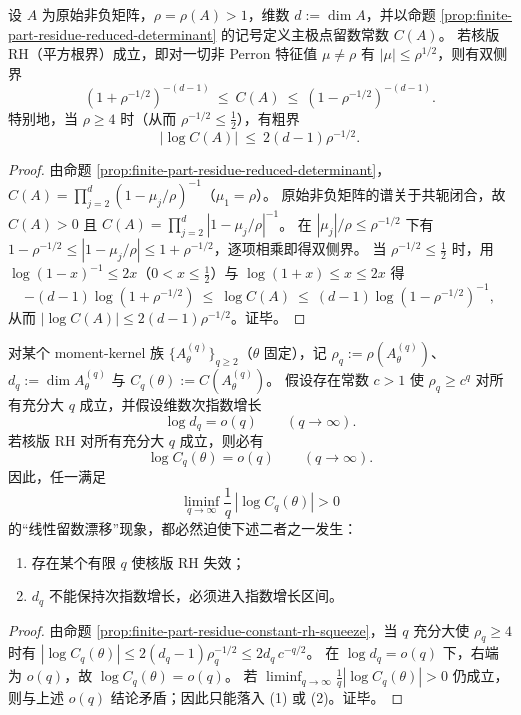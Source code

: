 \begin{proposition}\label{prop:finite-part-residue-constant-rh-squeeze}
设 \(A\) 为原始非负矩阵，\(\rho=\rho(A)>1\)，维数 \(d:=\dim A\)，并以命题 \ref{prop:finite-part-residue-reduced-determinant} 的记号定义主极点留数常数 \(C(A)\)。
若核版 RH（平方根界）成立，即对一切非 Perron 特征值 \(\mu\neq\rho\) 有 \(|\mu|\le \rho^{1/2}\)，则有双侧界
\[
(1+\rho^{-1/2})^{-(d-1)}\ \le\ C(A)\ \le\ (1-\rho^{-1/2})^{-(d-1)}.
\]
特别地，当 \(\rho\ge 4\) 时（从而 \(\rho^{-1/2}\le \tfrac12\)），有粗界
\[
|\log C(A)|\ \le\ 2(d-1)\rho^{-1/2}.
\]
\end{proposition}

\begin{proof}
由命题 \ref{prop:finite-part-residue-reduced-determinant}，
\(
C(A)=\prod_{j=2}^{d}(1-\mu_j/\rho)^{-1}
\)（\(\mu_1=\rho\)）。
原始非负矩阵的谱关于共轭闭合，故 \(C(A)>0\) 且
\(
C(A)=\prod_{j=2}^{d}|1-\mu_j/\rho|^{-1}
\)。
在 \(|\mu_j|/\rho\le \rho^{-1/2}\) 下有
\(
1-\rho^{-1/2}\le |1-\mu_j/\rho|\le 1+\rho^{-1/2}
\)，逐项相乘即得双侧界。
当 \(\rho^{-1/2}\le\tfrac12\) 时，用 \(\log(1-x)^{-1}\le 2x\)（\(0<x\le\tfrac12\)）与 \(\log(1+x)\le x\le 2x\) 得
\[
-(d-1)\log(1+\rho^{-1/2})
\ \le\ \log C(A)\ \le\ (d-1)\log(1-\rho^{-1/2})^{-1},
\]
从而 \(|\log C(A)|\le 2(d-1)\rho^{-1/2}\)。证毕。
\end{proof}

\begin{theorem}\label{thm:finite-part-residue-drift-trichotomy}
对某个 moment-kernel 族 \(\{A^{(q)}_\theta\}_{q\ge 2}\)（\(\theta\) 固定），记
\(\rho_q:=\rho(A^{(q)}_\theta)\)、\(d_q:=\dim A^{(q)}_\theta\) 与 \(C_q(\theta):=C(A^{(q)}_\theta)\)。
假设存在常数 \(c>1\) 使 \(\rho_q\ge c^q\) 对所有充分大 \(q\) 成立，并假设维数次指数增长
\[
\log d_q=o(q)\qquad(q\to\infty).
\]
若核版 RH 对所有充分大 \(q\) 成立，则必有
\[
\log C_q(\theta)=o(q)\qquad(q\to\infty).
\]
因此，任一满足
\[
\liminf_{q\to\infty}\frac{1}{q}\,|\log C_q(\theta)|>0
\]
的“线性留数漂移”现象，都必然迫使下述二者之一发生：
\begin{enumerate}
  \item 存在某个有限 \(q\) 使核版 RH 失效；
  \item \(d_q\) 不能保持次指数增长，必须进入指数增长区间。
\end{enumerate}
\end{theorem}

\begin{proof}
由命题 \ref{prop:finite-part-residue-constant-rh-squeeze}，当 \(q\) 充分大使 \(\rho_q\ge 4\) 时有
\(
|\log C_q(\theta)|\le 2(d_q-1)\rho_q^{-1/2}
\le 2d_q\,c^{-q/2}
\)。
在 \(\log d_q=o(q)\) 下，右端为 \(o(q)\)，故 \(\log C_q(\theta)=o(q)\)。
若 \(\liminf_{q\to\infty}\frac{1}{q}|\log C_q(\theta)|>0\) 仍成立，则与上述 \(o(q)\) 结论矛盾；因此只能落入 (1) 或 (2)。证毕。
\end{proof}


